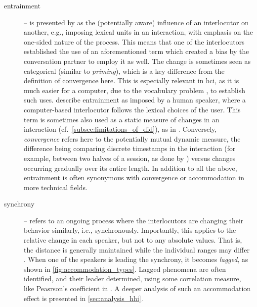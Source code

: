 \begin{description}
	\item[entrainment] -- is presented by \citet{Brennan1996lexical} as the (potentially aware) influence of an interlocutor on another, e.g., imposing lexical units in an interaction, with emphasis on the one-sided nature of the process.
	This means that one of the interlocutors established the use of an aforementioned term which created a bias by the conversation partner to employ it as well.
	The change is sometimes seen as categorical (similar to \textit{priming}), which is a key difference from the definition of convergence here.
	This is especially relevant in \ac{hci}, as it is much easier for a computer, due to the vocabulary problem \citep{Furnas1987vocabulary}, to establish such uses.
	\citet{Lopes2013automated} describe entrainment as imposed by a human speaker, where a computer-based interlocutor follows the lexical choices of the user.
	This term is sometimes also used as a static measure of changes in an interaction (cf.\ \cref{subsec:limitations_of_did}), as in \citet{Levitan2013entrainment}.
	Conversely, \emph{convergence} refers here to the potentially mutual dynamic measure, the difference being comparing discrete timestamps in the interaction (for example, between two halves of a session, as done by \citet{Xia2014prosodic}) versus changes occurring gradually over its entire length.
	In addition to all the above, entrainment is often synonymous with convergence or accommodation in more technical fields.
	
	\item[synchrony] -- refers to an ongoing process where the interlocutors are changing their behavior similarly, i.e., synchronously.
	Importantly, this applies to the relative change in each speaker, but not to any absolute values.
	That is, the distance is generally maintained while the individual ranges may differ \citep[see example in \cref{fig:synchrony_switchboard} and Figure 1 in][]{Levitan2011measuring}.
	When one of the speakers is leading the synchrony, it becomes \emph{lagged}, as shown in \cref{fig:accommodation_types}.
	Lagged phenomena are often identified, and their leader determined, using some correlation measure, like Peasrson's coefficient in \citet{Edlund2009pause, Xia2014prosodic}.
	A deeper analysis of such an accommodation effect is presented in \cref{sec:analysis_hhi}.
	

\end{description}
